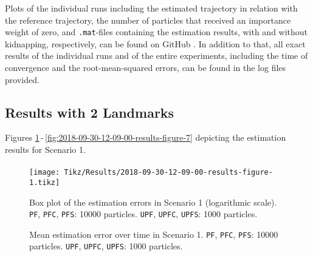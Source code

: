 Plots of the individual runs including the estimated trajectory in relation with the reference trajectory, the number of particles that received an importance weight of zero, and \texttt{.mat}-files containing the estimation results, with and without kidnapping, respectively, can be found on GitHub \cite{codeGithub}. In addition to that, all exact results of the individual runs and of the entire experiments, including the time of convergence and the root-mean-squared errors, can be found in the log files provided. 

\pagebreak

\subsection{Results with 2 Landmarks}

Figures \ref{fig:2018-09-30-12-09-00-results-figure-1}\,-\,\ref{fig:2018-09-30-12-09-00-results-figure-7} depicting the estimation results for Scenario 1.

\paragraph{}


\begin{figure}[h!]
	\centering
	\setlength\figureheight{0.8\textheight} 	
	\setlength{}		
	\texttt{[image: Tikz/Results/2018-09-30-12-09-00-results-figure-1.tikz]}			
	\caption[Box plot of the estimation errors in Scenario 1. \texttt{PF}, \texttt{PFC}, \texttt{PFS}: 10000 particles. \texttt{UPF}, \texttt{UPFC}, \texttt{UPFS}: 1000 particles.]{Box plot of the estimation errors in Scenario 1 (logarithmic scale). \texttt{PF}, \texttt{PFC}, \texttt{PFS}: 10000 particles. \texttt{UPF}, \texttt{UPFC}, \texttt{UPFS}: 1000 particles.}
	\label{fig:2018-09-30-12-09-00-results-figure-1}			
\end{figure}

\begin{figure}
	\centering
	\setlength{} 	
	\setlength\figurewidth{0.9\textheight}		
	\caption[Mean estimation error over time in Scenario 1. \texttt{PF}, \texttt{PFC}, \texttt{PFS}: 10000 particles. \texttt{UPF}, \texttt{UPFC}, \texttt{UPFS}: 1000 particles.]{Mean estimation error over time in Scenario 1. \texttt{PF}, \texttt{PFC}, \texttt{PFS}: 10000 particles. \texttt{UPF}, \texttt{UPFC}, \texttt{UPFS}: 1000 particles.}
	\label{fig:2018-09-30-12-09-00-results-figure-5}			
\end{figure}


